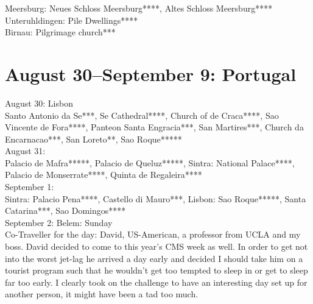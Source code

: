 Meersburg: Neues Schloss Meersburg****, Altes Schloss Meersburg****\\
Unteruhldingen: Pile Dwellings****\\
Birnau: Pilgrimage church***

\section{August 30--September 9: Portugal}
\label{Portugal2012}

August 30: Lisbon\\
Santo Antonio da Se***, Se Cathedral****, Church of de Craca****, Sao Vincente de Fora****,  Panteon Santa Engracia***, San Martires***, Church da Encarnacao***, San Loreto**, Sao Roque*****\\

August 31:\\
Palacio de Mafra*****, Palacio de Queluz*****, Sintra: National Palace****, Palacio de Monserrate****, Quinta de Regaleira****\\

September 1:\\
Sintra: Palacio Pena****, Castello di Mauro***, Lisbon: Sao Roque*****, Santa Catarina***, Sao Domingos****\\

September 2: Belem: Sunday\\
Co-Traveller for the day: David, US-American, a professor from UCLA and my boss. David decided to come to this year's CMS week as well. In order to get not into the worst jet-lag he arrived a day early and decided I should take him on a tourist program such that he wouldn't get too tempted to sleep in or get to sleep far too early. I clearly took on the challenge to have an interesting day set up for another person, it might have been a tad too much.\\

